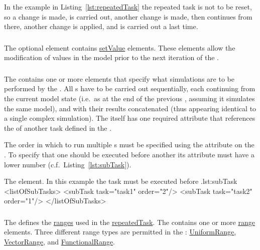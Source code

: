 In the example in  Listing~\ref{lst:repeatedTask} the repeated task is not to be reset, so a change is made,  is carried out, another change is made, then  continues from there, another change is applied, and  is carried out a last time.

\subsubsection{}
\label{sec:changes}
The optional  element contains \hyperref[class:setValue]{setValue} elements. These elements allow the modification of values in the model prior to the next iteration of the .

\subsubsection{}
\label{class:subTask}
The  contains one or more  elements that specify what simulations are to be performed by the .
All s have to be carried out sequentially, each continuing from the current model state (i.e.\ as at the end of the previous , assuming it simulates the same model), and with their results concatenated (thus appearing identical to a single complex simulation). The  itself has one required attribute  that references the  of another task defined in the .

The order in which to run multiple s must be specified using the  attribute on the . To specify that one  should be executed before another its  attribute must have a lower number (c.f.\ Listing~\ref{lst:subTask}).

\begin{myXmlLst}{The  element. In this example the task  must be executed before .}{lst:subTask}
<listOfSubTasks>
	<subTask task="task1" order="2"/> 
	<subTask task="task2" order="1"/> 
</listOfSubTasks>
\end{myXmlLst}

\subsubsection{}
\label{sec:listOfRanges}
The  defines the \hyperref[class:range]{ranges} used in the \hyperref[class:repeatedTask]{repeatedTask}. The  contains one or more \hyperref[class:range]{range} elements. Three different range types are permitted in the : \hyperref[class:uniformRange]{UniformRange}, \hyperref[class:vectorRange]{VectorRange}, and \hyperref[class:functionalRange]{FunctionalRange}.

